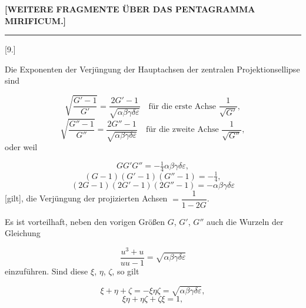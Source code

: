 
\begin{center}\textbf{[WEITERE FRAGMENTE ÜBER DAS PENTAGRAMMA MIRIFICUM.]}\end{center}

\begin{center}\rule{1.5cm}{.4pt}\end{center}

\begin{center}[9.]\end{center}

Die Exponenten der Verjüngung der Hauptachsen der zentralen Projektionsellipse sind

\[
\sqrt{\dfrac{G'-1}{G'}} = \dfrac{2G'-1}{\sqrt{\alpha\beta\gamma\delta\varepsilon}} \quad \text{für die erste Achse } \dfrac{1}{\sqrt{G'}},
\]
\[
\sqrt{\dfrac{G''-1}{G''}} = \dfrac{2G''-1}{\sqrt{\alpha\beta\gamma\delta\varepsilon}} \quad \text{für die zweite Achse } \dfrac{1}{\sqrt{G''}},
\]
oder weil

\[
GG'G'' = -\tfrac14 \alpha\beta\gamma\delta\varepsilon,
\]
\[
(G-1)(G'-1)(G''-1) = -\tfrac14,
\]
\[
(2G-1)(2G'-1)(2G''-1) = -\alpha\beta\gamma\delta\varepsilon
\]
[gilt], die Verjüngung der projizierten Achsen $= \dfrac{1}{1-2G}$.

Es ist vorteilhaft, neben den vorigen Größen $G$, $G'$, $G''$ auch die Wurzeln der Gleichung

\[
\frac{u^3+u}{uu-1} = \sqrt{\alpha\beta\gamma\delta\varepsilon}
\]
einzuführen. Sind diese $\xi$, $\eta$, $\zeta$, so gilt

\[
\xi+\eta+\zeta = -\xi\eta\zeta = \sqrt{\alpha\beta\gamma\delta\varepsilon},
\]
\[
\xi\eta+\eta\zeta+\zeta\xi = 1,
\]
